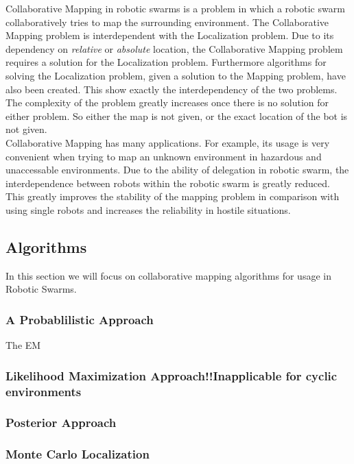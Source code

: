 Collaborative Mapping in robotic swarms is a problem in which a robotic swarm collaboratively tries to map the surrounding environment. 
The Collaborative Mapping problem is interdependent with the Localization problem.\cite{thrun2000real}
Due to its dependency on \emph{relative} or \emph{absolute} location, the Collaborative Mapping problem requires a solution for the Localization problem.
Furthermore algorithms for solving the Localization problem, given a solution to the Mapping problem, have also been created.\cite{borenstein1996navigating} 
This show exactly the interdependency of the two problems.
The complexity of the problem greatly increases once there is no solution for either problem.
So either the map is not given, or the exact location of the bot is not given.\\

Collaborative Mapping has many applications.
For example, its usage is very convenient when trying to map an unknown environment in hazardous and unaccessable environments.\cite{hardin2004modified}
Due to the ability of delegation in robotic swarm, the interdependence between robots within the robotic swarm is greatly reduced.
This greatly improves the stability of the mapping problem in comparison with using single robots and increases the reliability in hostile situations.\\

\subsection{Algorithms}
In this section we will focus on collaborative mapping algorithms for usage in Robotic Swarms.

\subsubsection{A Probablilistic Approach}
The EM
\subsubsection{Likelihood Maximization Approach!!Inapplicable for cyclic environments}
\subsubsection{Posterior Approach}
\subsubsection{Monte Carlo Localization}
